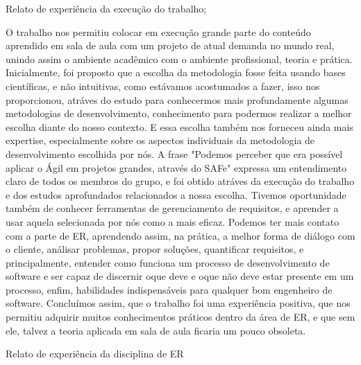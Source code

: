 Relato de experiência da execução do trabalho;

    O trabalho nos permitiu colocar em execução grande parte do conteúdo aprendido em sala de aula
com um projeto de atual demanda no mundo real, unindo assim o ambiente acadêmico com o ambiente profissional,
teoria e prática.
Inicialmente, foi proposto que a escolha da metodologia fosse feita usando bases científicas, e não
intuitivas, como estávamos acostumados a fazer, isso nos proporcionou, atráves do estudo para conhecermos
mais profundamente algumas metodologias de desenvolvimento, conhecimento para podermos realizar a melhor
escolha diante do nosso contexto. E essa escolha também nos forneceu ainda mais expertise,
especialmente sobre os aspectos individuais da metodologia de desenvolvimento escolhida por nós.
A frase "Podemos perceber que era possível aplicar o Ágil em projetos grandes, através do SAFe"
expressa um entendimento claro de todos os membros do grupo, e foi obtido atráves da execução do trabalho
e dos estudos aprofundados relacionados a nossa escolha.
    Tivemos oportunidade também de conhecer ferramentas de gerenciamento de requisitos, e aprender a usar
aquela selecionada por nós como a mais eficaz.
    Podemos ter mais contato com a parte de ER, aprendendo assim, na prática, a melhor forma de diálogo
com o cliente, análisar problemas, propor soluções, quantificar requisitos, e principalmente,
entender como funciona um processo de desenvolvimento de software e ser capaz de discernir oque deve
e oque não deve estar presente em um processo, enfim, habilidades indispensáveis
para qualquer bom engenheiro de software.
    Concluímos assim, que o trabalho foi uma experiência positiva, que nos permitiu adquirir muitos
conhecimentos práticos dentro da área de ER, e que sem ele, talvez a teoria aplicada em sala de aula
ficaria um pouco obsoleta.

Relato de experiência da disciplina de ER

